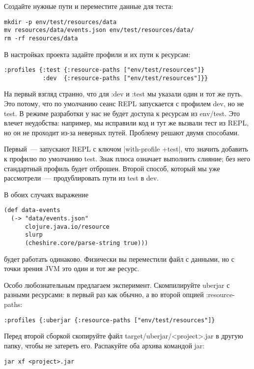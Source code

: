 Создайте нужные пути и переместите данные для теста:

\begin{verbatim}
mkdir -p env/test/resources/data
mv resources/data/events.json env/test/resources/data/
rm -rf resources/data
\end{verbatim}

В настройках проекта задайте профили и их пути к ресурсам:

\begin{verbatim}
:profiles {:test {:resource-paths ["env/test/resources"]}
           :dev  {:resource-paths ["env/test/resources"]}}
\end{verbatim}

На первый взгляд странно, что для :dev и :test мы указали один и тот же
путь. Это потому, что по умолчанию сеанс REPL запускается с профилем dev, но не
test. В режиме разработки у нас не будет доступа к ресурсам из env/test. Это
влечет неудобства: например, мы исправили код и тут же вызвали тест из REPL, но
он не проходит из-за неверных путей. Проблему решают двумя способами.

Первый~--- запускают REPL с ключом \spverb|with-profile +test|, что значить добавить к
профилю по умолчанию test. Знак плюса означает выполнить слияние; без него
стандартный профиль будет отброшен. Второй способ, который мы уже рассмотрели~---
продублировать пути из test в dev.

В обоих случаях выражение

\begin{verbatim}
(def data-events
  (-> "data/events.json"
      clojure.java.io/resource
      slurp
      (cheshire.core/parse-string true)))
\end{verbatim}

будет работать одинаково. Физически вы переместили файл с данными, но с точки
зрения JVM это один и тот же ресурс.

Особо любознательным предлагаем эксперимент. Скомпилируйте uberjar с разными
ресурсами: в первый раз как обычно, а во второй опцией :resource-paths:

\begin{verbatim}
:profiles {:uberjar {:resource-paths ["env/test/resources"]}
\end{verbatim}

Перед второй сборкой скопируйте файл target/uberjar/<project>.jar в другую
папку, чтобы не затереть его. Распакуйте оба архива командой jar:

\begin{verbatim}
jar xf <project>.jar
\end{verbatim}


